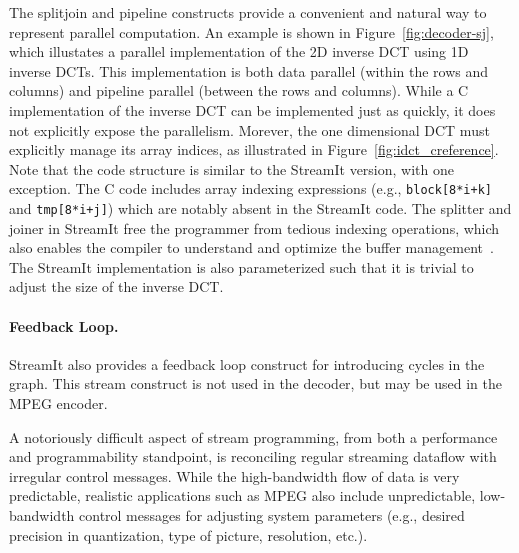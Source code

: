 The splitjoin and pipeline constructs provide a convenient and natural
way to represent parallel computation. An example is shown in
Figure~\ref{fig:decoder-sj}, which illustates a parallel
implementation of the 2D inverse DCT using 1D inverse DCTs. This
implementation is both data parallel (within the rows and columns) and
pipeline parallel (between the rows and columns). While a C
implementation of the inverse DCT can be implemented just as quickly,
it does not explicitly expose the parallelism. Morever, the one
dimensional DCT must explicitly manage its array indices, as
illustrated in Figure~\ref{fig:idct_creference}. Note that the code
structure is similar to the StreamIt version, with one exception. The
C code includes array indexing expressions (e.g.,
\texttt{block[8*i+k]} and \texttt{tmp[8*i+j]}) which are notably
absent in the StreamIt code. The splitter and joiner in StreamIt free
the programmer from tedious indexing operations, which also enables
the compiler to understand and optimize the buffer
management~\cite{sermulins05lctes}.  The StreamIt implementation is
also parameterized such that it is trivial to adjust the size of the
inverse DCT.


\paragraph{Feedback Loop.}
StreamIt also provides a feedback loop construct for introducing
cycles in the graph. This stream construct is not used in the decoder,
but may be used in the MPEG encoder.

\label{sec:messaging}
A notoriously difficult aspect of stream programming, from both a
performance and programmability standpoint, is reconciling regular
streaming dataflow with irregular control messages.  While the
high-bandwidth flow of data is very predictable, realistic
applications such as MPEG also include unpredictable, low-bandwidth
control messages for adjusting system parameters (e.g., desired
precision in quantization, type of picture, resolution, etc.).

